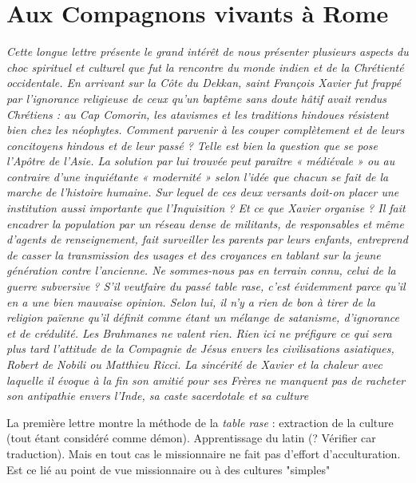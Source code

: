 \newpage
\section{Aux Compagnons vivants à Rome}

\textit{Cette longue lettre présente le grand intérêt de nous présenter
plusieurs aspects du choc spirituel et culturel que fut la rencontre
du monde indien et de la Chrétienté occidentale. En arrivant sur
la Côte du Dekkan, saint François Xavier fut frappé par l'ignorance
religieuse de ceux qu'un baptême sans doute hâtif avait rendus
Chrétiens : au Cap Comorin, les atavismes et les traditions hindoues résistent bien chez les néophytes. Comment parvenir à les
couper complètement et de leurs concitoyens hindous et de leur
passé ? Telle est bien la question que se pose l'Apôtre de l'Asie.
La solution par lui trouvée peut paraître « médiévale » ou au
contraire d'une inquiétante « modernité » selon l'idée que chacun
se fait de la marche de l'histoire humaine. Sur lequel de ces deux
versants doit-on placer une institution aussi importante que l'Inquisition
? Et ce que Xavier organise ? Il fait encadrer la population
par un réseau dense de militants, de responsables et même d'agents
de renseignement, fait surveiller les parents par leurs enfants, entreprend
de casser la transmission des usages et des croyances en
tablant sur la jeune génération contre l'ancienne. Ne sommes-nous
pas en terrain connu, celui de la guerre subversive ? S'il veutfaire
du passé table rase, c'est évidemment parce qu'il en a une bien
mauvaise opinion. Selon lui, il n'y a rien de bon à tirer de la religion
païenne qu'il définit comme étant un mélange de satanisme,
d'ignorance et de crédulité. Les Brahmanes ne valent rien. Rien ici
ne préfigure ce qui sera plus tard l'attitude de la Compagnie de
Jésus envers les civilisations asiatiques, Robert de Nobili ou Matthieu
Ricci. La sincérité de Xavier et la chaleur avec laquelle il évoque
à la fin son amitié pour ses Frères ne manquent pas de racheter
son antipathie envers l'Inde, sa caste sacerdotale et sa culture}


\begin{Synthesis}
La première lettre montre la méthode de la \textit{table rase} : extraction de la culture (tout étant considéré comme démon). Apprentissage du latin (? Vérifier car traduction). Mais en tout cas le missionnaire ne fait pas d'effort d'acculturation.
Est ce lié au point de vue missionnaire ou à des cultures "simples"
\end{Synthesis}

